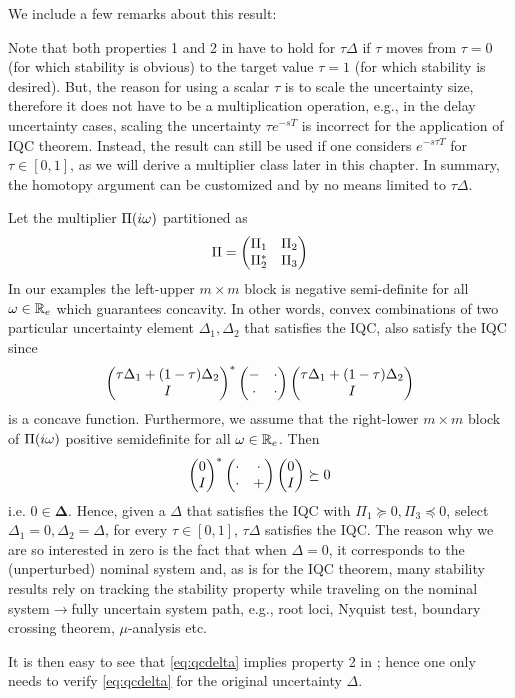 We include a few remarks about this result: 
\begin{rem}\label{remiqc1}
Note that both properties 1 and 2 in  have to hold for $\tau\Delta$ 
if $\tau$ moves from $\tau=0$ (for which stability is obvious) to the target value $\tau=1$ 
(for which stability is desired). But, the reason for using a scalar $\tau$ is to scale the uncertainty
size, therefore it does not have to be a multiplication operation, e.g., in the delay uncertainty cases,
scaling the uncertainty $\tau e^{-sT}$ is incorrect for the application of IQC theorem. Instead, 
the result can still be used if one considers $e^{-s\tau T}$ for $\tau\in[0,1]$, as we will derive
a multiplier class later in this chapter. In summary, the homotopy 
argument can be customized and  by no means limited to $\tau\Delta$. 

Let the multiplier $\Pi(i\omega)$ partitioned as
\begin{equation}
\Pi = \begin{pmatrix}\Pi_1&\Pi_2\\\Pi_2^* &\Pi_3\end{pmatrix}
\label{eq:Pipart}
\end{equation}
In our examples the left-upper $m\times m$ block is negative semi-definite for all $\omega\in\mathbb{R}_e$
which guarantees concavity. In other words, convex combinations of two particular uncertainty element 
$\Delta_1, \Delta_2$ that satisfies the IQC, also satisfy the IQC since
\[
\begin{pmatrix}\tau\Delta_1+(1-\tau)\Delta_2\\ I\end{pmatrix}^*\begin{pmatrix}-&\cdot\\\cdot &\cdot\end{pmatrix}\begin{pmatrix}\tau\Delta_1+(1-\tau)\Delta_2\\I\end{pmatrix}
\]
is a concave function. Furthermore, we assume that the right-lower $m\times m$ block of $\Pi(i\omega)$ 
positive semidefinite for all $\omega\in\mathbb{R}_e$. Then
\[
\begin{pmatrix}0\\I\end{pmatrix}^*\begin{pmatrix}\cdot &\cdot\\\cdot &+\end{pmatrix}\begin{pmatrix}0\\ I\end{pmatrix} \succeq 0
\]
i.e. $0\in\bm{\Delta}$.
Hence, given a $\Delta$ that satisfies the IQC with $\Pi_1 \succeq 0, \Pi_3\preceq 0$, select $\Delta_1 = 0, \Delta_2 = \Delta$, 
for every $\tau\in [0,1]$, $\tau\Delta$ satisfies the IQC. 
The reason why we are so interested in zero is the fact that when $\Delta=0$, it corresponds to the (unperturbed) nominal 
system and, as is for the IQC theorem, many stability results rely on tracking the stability property while traveling on 
the nominal system$\to$fully uncertain system path, e.g., root loci, Nyquist test, boundary crossing theorem, $\mu$-analysis
etc. 


It is then easy to see that \eqref{eq:qcdelta} implies property 2 in ; 
hence one only needs to verify \eqref{eq:qcdelta} for the original uncertainty $\Delta$.
\end{rem}

